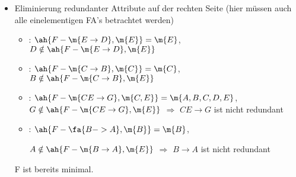 \documentclass{bschlangaul-aufgabe}
\begin{document}
\begin{enumerate}
\begin{bAntwort}
\begin{itemize}
\item Eliminierung redundanter Attribute auf der rechten Seite (hier
müssen auch alle einelementigen FA’s betrachtet werden)

\begin{itemize}
\item {}: $\ah{F - \m{E \rightarrow D}, \m{E}} = \m{E}$, \dh
$D \notin \ah{F - \m{E \rightarrow D}, \m{E}}$

\item {}: $\ah{F - \m{C \rightarrow B}, \m{C}} = \m{C}$, \dh
$B \notin \ah{F - \m{C \rightarrow B}, \m{E}}$

\item {}: $\ah{F - \m{CE \rightarrow G}, \m{C, E}} = \m{A, B, C, D, E}$, \dh
$G \notin \ah{F - \m{CE \rightarrow G}, \m{E}}$
$\Rightarrow$ $CE \rightarrow G$ ist nicht redundant

\item {}: $\ah{F - \fa{B -> A}, \m{B}} = \m{B}$, \dh

$A \notin \ah{F - \m{B \rightarrow A}, \m{E}}$
$\Rightarrow$ $B \rightarrow A$ ist nicht redundant
\end{itemize}

F ist bereits minimal.
\end{itemize}
\end{bAntwort}
\end{enumerate}
\end{document}
